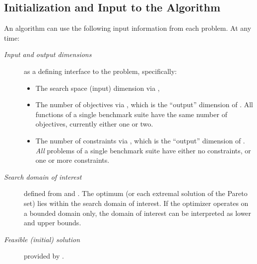 \documentclass[letterpaper,12pt,english]{article}
\begin{document}
\subsection{Initialization and Input to the Algorithm}
\label{index:initialization-and-input-to-the-algorithm}\label{index:sec-input}
An algorithm can use the following input information from each problem.
At any time:
\begin{description}
\item[{\emph{Input and output dimensions}}] \leavevmode
as a defining interface to the problem, specifically:
\begin{itemize}
\item {} 
The search space (input) dimension via \href{http://numbbo.github.io/coco-doc/C/coco\_8h.html\#a0dabf3e4f5630d08077530a1341f13ab}{},

\item {} 
The number of objectives via \href{http://numbbo.github.io/coco-doc/C/coco\_8h.html\#ab0d1fcc7f592c283f1e67cde2afeb60a}{},
which is the ``output'' dimension of \href{http://numbbo.github.io/coco-doc/C/coco\_8h.html\#aabbc02b57084ab069c37e1c27426b95c}{}.
All functions of a single benchmark suite have the same number
of objectives, currently either one or two.

\item {} 
The number of constraints via \href{http://numbbo.github.io/coco-doc/C/coco\_8h.html\#ad5c7b0889170a105671a14c8383fbb22}{},
which is the ``output'' dimension of \href{http://numbbo.github.io/coco-doc/C/coco\_8h.html\#ab5cce904e394349ec1be1bcdc35967fa}{}. \emph{All}
problems of a single benchmark suite have either no constraints, or
one or more constraints.

\end{itemize}

\item[{\emph{Search domain of interest}}] \leavevmode
defined from \href{http://numbbo.github.io/coco-doc/C/coco\_8h.html\#a29c89e039494ae8b4f8e520cba1eb154}{} and \href{http://numbbo.github.io/coco-doc/C/coco\_8h.html\#a4ea6c067adfa866b0179329fe9b7c458}{}. The optimum (or each extremal solution of the Pareto set) lies within the search domain of interest. If the optimizer operates on a bounded domain only, the domain of interest can be interpreted as lower and upper bounds.

\item[{\emph{Feasible (initial) solution}}] \leavevmode
provided by \href{http://numbbo.github.io/coco-doc/C/coco\_8h.html\#ac5a44845acfadd7c5cccb9900a566b32}{}.

\end{description}
\end{document}
